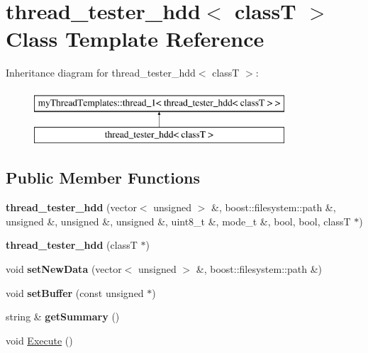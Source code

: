 \hypertarget{classthread__tester__hdd}{
\section{thread\_\-tester\_\-hdd$<$ classT $>$ Class Template Reference}
\label{classthread__tester__hdd}
}
Inheritance diagram for thread\_\-tester\_\-hdd$<$ classT $>$:\begin{figure}[H]
\begin{center}
\leavevmode
\includegraphics[height=2cm]{classthread__tester__hdd}
\end{center}
\end{figure}
\subsection*{Public Member Functions}
\begin{DoxyCompactItemize}
\item 
\hypertarget{classthread__tester__hdd_a61a3e064a200121741764b09cea2a6fe}{
{\bfseries thread\_\-tester\_\-hdd} (vector$<$ unsigned $>$ \&, boost::filesystem::path \&, unsigned \&, unsigned \&, unsigned \&, uint8\_\-t \&, mode\_\-t \&, bool, bool, classT $\ast$)}
\label{classthread__tester__hdd_a61a3e064a200121741764b09cea2a6fe}

\item 
\hypertarget{classthread__tester__hdd_a276dec24bd450a5c6322bd60bf99fda1}{
{\bfseries thread\_\-tester\_\-hdd} (classT $\ast$)}
\label{classthread__tester__hdd_a276dec24bd450a5c6322bd60bf99fda1}

\item 
\hypertarget{classthread__tester__hdd_a5b972aaaec16e71925772d6c8eba6fa5}{
void {\bfseries setNewData} (vector$<$ unsigned $>$ \&, boost::filesystem::path \&)}
\label{classthread__tester__hdd_a5b972aaaec16e71925772d6c8eba6fa5}

\item 
\hypertarget{classthread__tester__hdd_a761ba63cd102923e85cbb0a2f79a149b}{
void {\bfseries setBuffer} (const unsigned $\ast$)}
\label{classthread__tester__hdd_a761ba63cd102923e85cbb0a2f79a149b}

\item 
\hypertarget{classthread__tester__hdd_ac6cf97eb350171f433880185320a88c2}{
string \& {\bfseries getSummary} ()}
\label{classthread__tester__hdd_ac6cf97eb350171f433880185320a88c2}

\item 
void \hyperlink{classthread__tester__hdd_aad16d6b6f1be66d5e851fa2b0408cf06}{Execute} ()
\end{DoxyCompactItemize}
